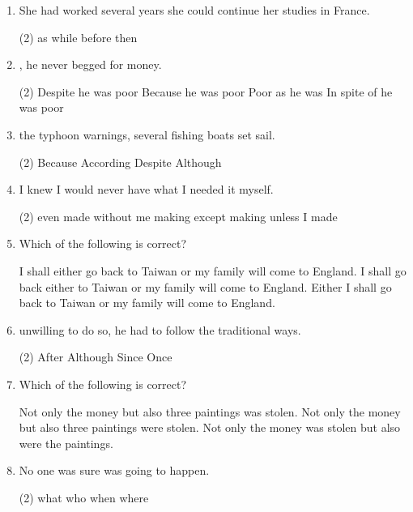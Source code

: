 \begin{enumerate}
\item She had worked several years \ttu she could continue her studies in France.
\begin{tasks}(2)
  \task as
  \task while
  \task before
  \task then
\end{tasks}

\item \ttu, he never begged for money.
\begin{tasks}(2)
  \task Despite he was poor
  \task Because he was poor
  \task Poor as he was
  \task In spite of he was poor
\end{tasks}

\item \ttu the typhoon warnings, several fishing boats set sail.
\begin{tasks}(2)
  \task Because
  \task According
  \task Despite
  \task Although
\end{tasks}

\item I knew I would never have what I needed \ttu it myself.
\begin{tasks}(2)
  \task even made
  \task without me making
  \task except making
  \task unless I made
\end{tasks}

\item Which of the following is correct?
\begin{tasks}
  \task I shall either go back to Taiwan or my family will come to England.
  \task I shall go back either to Taiwan or my family will come to England.
  \task Either I shall go back to Taiwan or my family will come to England.
\end{tasks}

\item \ttu unwilling to do so, he had to follow the traditional ways.
\begin{tasks}(2)
  \task After
  \task Although
  \task Since
  \task Once
\end{tasks}

\item Which of the following is correct?
\begin{tasks}
  \task Not only the money but also three paintings was stolen.
  \task Not only the money but also three paintings were stolen.
  \task Not only the money was stolen but also were the paintings.
\end{tasks}

\item No one was sure \ttu was going to happen.
\begin{tasks}(2)
  \task what
  \task who
  \task when
  \task where
\end{tasks}


\end{enumerate}
